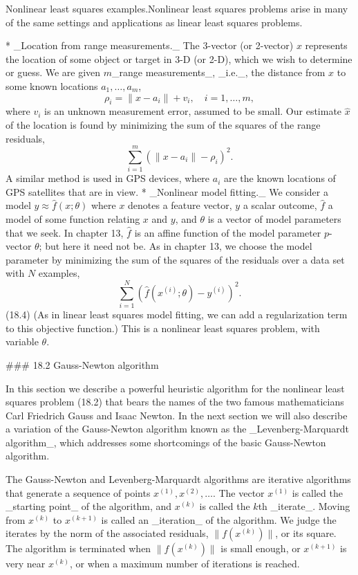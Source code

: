 Nonlinear least squares examples.Nonlinear least squares problems arise in many of the same settings and applications as linear least squares problems.

* _Location from range measurements._ The 3-vector (or 2-vector) \(x\) represents the location of some object or target in 3-D (or 2-D), which we wish to determine or guess. We are given \(m\)_range measurements_, _i.e._, the distance from \(x\) to some known locations \(a_{1},\ldots,a_{m}\), \[\rho_{i}=\|x-a_{i}\|+v_{i},\quad i=1,\ldots,m,\] where \(v_{i}\) is an unknown measurement error, assumed to be small. Our estimate \(\hat{x}\) of the location is found by minimizing the sum of the squares of the range residuals, \[\sum_{i=1}^{m}\left(\|x-a_{i}\|-\rho_{i}\right)^{2}.\] A similar method is used in GPS devices, where \(a_{i}\) are the known locations of GPS satellites that are in view.
* _Nonlinear model fitting._ We consider a model \(y\approx\hat{f}(x;\theta)\) where \(x\) denotes a feature vector, \(y\) a scalar outcome, \(\hat{f}\) a model of some function relating \(x\) and \(y\), and \(\theta\) is a vector of model parameters that we seek. In chapter 13, \(\hat{f}\) is an affine function of the model parameter \(p\)-vector \(\theta\); but here it need not be. As in chapter 13, we choose the model parameter by minimizing the sum of the squares of the residuals over a data set with \(N\) examples, \[\sum_{i=1}^{N}(\hat{f}(x^{(i)};\theta)-y^{(i)})^{2}.\] (18.4) (As in linear least squares model fitting, we can add a regularization term to this objective function.) This is a nonlinear least squares problem, with variable \(\theta\).

### 18.2 Gauss-Newton algorithm

In this section we describe a powerful heuristic algorithm for the nonlinear least squares problem (18.2) that bears the names of the two famous mathematicians Carl Friedrich Gauss and Isaac Newton. In the next section we will also describe a variation of the Gauss-Newton algorithm known as the _Levenberg-Marquardt algorithm_, which addresses some shortcomings of the basic Gauss-Newton algorithm.

The Gauss-Newton and Levenberg-Marquardt algorithms are iterative algorithms that generate a sequence of points \(x^{(1)},x^{(2)},\ldots\). The vector \(x^{(1)}\) is called the _starting point_ of the algorithm, and \(x^{(k)}\) is called the \(k\)th _iterate_. Moving from \(x^{(k)}\) to \(x^{(k+1)}\) is called an _iteration_ of the algorithm. We judge the iterates by the norm of the associated residuals, \(\|f(x^{(k)})\|\), or its square. The algorithm is terminated when \(\|f(x^{(k)})\|\) is small enough, or \(x^{(k+1)}\) is very near \(x^{(k)}\), or when a maximum number of iterations is reached.

 